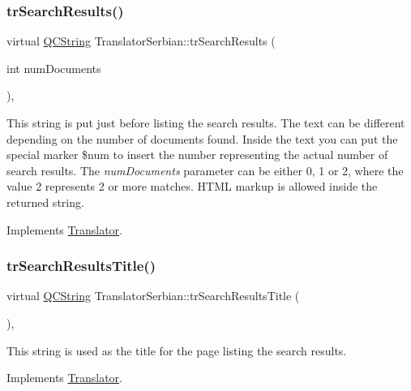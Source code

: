 \subsubsection{\texorpdfstring{trSearchResults()}{trSearchResults()}}
{\footnotesize\ttfamily virtual \mbox{\hyperlink{class_q_c_string}{Q\+C\+String}} Translator\+Serbian\+::tr\+Search\+Results (\begin{DoxyParamCaption}\item[{int}]{num\+Documents }\end{DoxyParamCaption})\hspace{0.3cm}{\ttfamily [inline]}, {\ttfamily [virtual]}}

This string is put just before listing the search results. The text can be different depending on the number of documents found. Inside the text you can put the special marker \$num to insert the number representing the actual number of search results. The {\itshape num\+Documents} parameter can be either 0, 1 or 2, where the value 2 represents 2 or more matches. H\+T\+ML markup is allowed inside the returned string. 

Implements \mbox{\hyperlink{class_translator}{Translator}}.

\mbox{\label{class_translator_serbian_ab6fa722e72e57fdc559605104853c40d}} 
\subsubsection{\texorpdfstring{trSearchResultsTitle()}{trSearchResultsTitle()}}
{\footnotesize\ttfamily virtual \mbox{\hyperlink{class_q_c_string}{Q\+C\+String}} Translator\+Serbian\+::tr\+Search\+Results\+Title (\begin{DoxyParamCaption}{ }\end{DoxyParamCaption})\hspace{0.3cm}{\ttfamily [inline]}, {\ttfamily [virtual]}}

This string is used as the title for the page listing the search results. 

Implements \mbox{\hyperlink{class_translator}{Translator}}.

\mbox{\label{class_translator_serbian_aa177e202824f4395229e533e8a264404}} 
